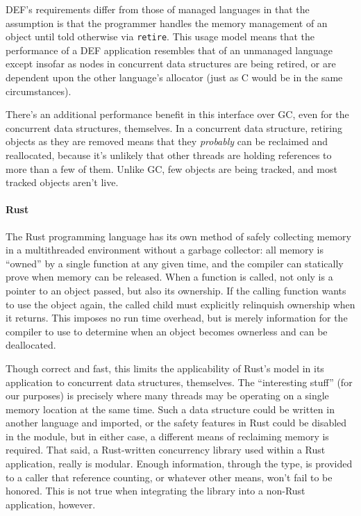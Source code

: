 DEF's requirements differ from those of managed languages in that the assumption is that the programmer handles the memory management of an object until told otherwise via \texttt{retire}.  This usage model means that the performance of a DEF application resembles that of an unmanaged language except insofar as nodes in concurrent data structures are being retired, or are dependent upon the other language's allocator (just as C would be in the same circumstances).

There's an additional performance benefit in this interface over GC, even for the concurrent data structures, themselves.  In a concurrent data structure, retiring objects as they are removed means that they \textit{probably} can be reclaimed and reallocated, because it's unlikely that other threads are holding references to more than a few of them.  Unlike GC, few objects are being tracked, and most tracked objects aren't live.

\paragraph{Rust} The Rust programming language has its own method of safely collecting memory in a multithreaded environment without a garbage collector: all memory is ``owned'' by a single function at any given time, and the compiler can statically prove when memory can be released.\cite{Rust}  When a function is called, not only is a pointer to an object passed, but also its ownership.  If the calling function wants to use the object again, the called child must explicitly relinquish ownership when it returns.  This imposes no run time overhead, but is merely information for the compiler to use to determine when an object becomes ownerless and can be deallocated.

Though correct and fast, this limits the applicability of Rust's model in its application to concurrent data structures, themselves.  The ``interesting stuff'' (for our purposes) is precisely where many threads may be operating on a single memory location at the same time.  Such a data structure could be written in another language and imported, or the safety features in Rust could be disabled in the module, but in either case, a different means of reclaiming memory is required.  That said, a Rust-written concurrency library used within a Rust application, really is modular.  Enough information, through the type, is provided to a caller that reference counting, or whatever other means, won't fail to be honored.  This is not true when integrating the library into a non-Rust application, however.

